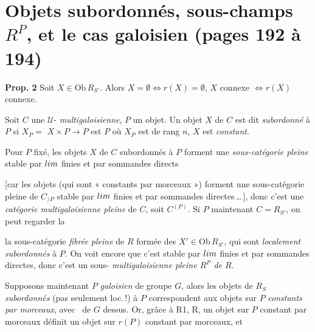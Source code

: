 \documentclass[11pt,a4paper]{article}
\begin{document}
\section*{Objets subordonnés, sous-champs $R^P$, et le cas galoisien (pages 192 à 194)}



\textbf{Prop. 2} Soit $X \in \mathrm{Ob}\,R_{S'}$. Alors
$X = \emptyset \Longleftrightarrow r(X) = \emptyset$, \; $X$ connexe
$\Longleftrightarrow r(X)$ connexe.

Soit $C$ une $\mathcal{U}$- \emph{multigaloisienne}, $P$ un
objet. Un objet $X$ de $C$ est dit \emph{subordonné} à $P$ si
$X_P =$  $X \times P \to P$ est   $P$ où $X_P$ est de rang $n$, $X$
est \emph{constant}.


Pour $P$ fixé, les objets $X$ de $C$ subordonnés à $P$ forment une
\emph{sous-catégorie pleine} stable par $\varprojlim$ finies et par sommandes
directs

[car les objets  (qui sont « constants par morceaux ») forment une
sous-catégorie pleine de $C_{/P}$ stable par $\varprojlim$ finies et par sommandes
directes\,\ldots\,], donc c'est une \emph{catégorie multigaloisienne pleine} de
$C$, soit $C^{(P)}$. Si $P$   maintenant $C = R_{S'}$, on peut regarder la

la sous-catégorie \emph{fibrée pleine} de $R$ formée des
$X' \in \mathrm{Ob}\,R_{S'}$, qui sont \emph{localement subordonnés} à $P$. On
voit encore que c'est stable par $\varprojlim$ finies et par sommandes
directes, donc c'est un sous- 
\emph{multigaloisienne pleine $R^P$ de $R$}.



Supposons maintenant $P$ \emph{galoisien} de groupe $G$, alors les objets de
$R_S$ \emph{subordonnés} (pas seulement loc.\,!) à $P$ correspondent aux objets
sur $P$ \emph{constants par morceaux}, avec \ de $G$ dessus. Or, grâce à
R1, R, un objet  sur $P$ constant par morceaux
définit un objet  sur $r(P)$ constant par morceaux, et
\end{document}
